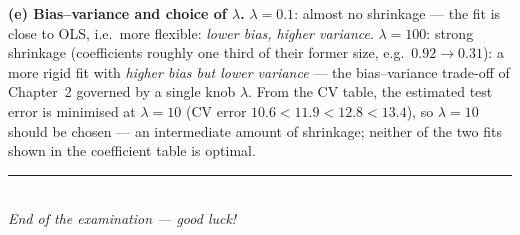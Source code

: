 \documentclass[11pt,a4paper]{article}
\begin{document}
\begin{solutionbox}
\medskip
\textbf{(e) Bias--variance and choice of $\lambda$.}
$\lambda=0.1$: almost no shrinkage --- the fit is close to OLS, i.e.\ more flexible:
\emph{lower bias, higher variance}. $\lambda=100$: strong shrinkage (coefficients roughly
one third of their former size, e.g.\ $0.92\to 0.31$): a more rigid fit with
\emph{higher bias but lower variance} --- the bias--variance trade-off of Chapter~2
governed by a single knob $\lambda$.
From the CV table, the estimated test error is minimised at $\lambda=10$
(CV error $10.6<11.9<12.8<13.4$), so \emph{$\lambda=10$} should be chosen --- an
intermediate amount of shrinkage; neither of the two fits shown in the coefficient table
is optimal.
\end{solutionbox}
\fi

\vspace{6mm}
\begin{center}
\rule{0.35\textwidth}{0.4pt}\\[1mm]
\textit{End of the examination --- good luck!}
\end{center}
\end{document}
